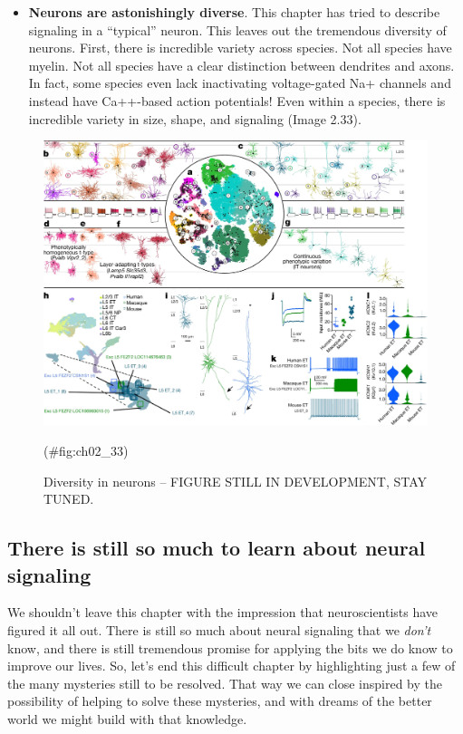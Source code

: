 \documentclass[
]{book}
\begin{document}
\begin{itemize}
\item
  \textbf{Neurons are astonishingly diverse}. This chapter has tried to describe signaling in a ``typical'' neuron. This leaves out the tremendous diversity of neurons. First, there is incredible variety across species. Not all species have myelin. Not all species have a clear distinction between dendrites and axons. In fact, some species even lack inactivating voltage-gated Na+ channels and instead have Ca++-based action potentials! Even within a species, there is incredible variety in size, shape, and signaling (Image 2.33).
\end{itemize}

\begin{figure}

{\centering \includegraphics[width=0.8\linewidth]{images/ch02/02_32} 

}

\caption{Diversity in neurons -- FIGURE STILL IN DEVELOPMENT, STAY TUNED.}(\#fig:ch02_33)
\end{figure}

\hypertarget{there-is-still-so-much-to-learn-about-neural-signaling}{%
\subsection{There is still so much to learn about neural signaling}\label{there-is-still-so-much-to-learn-about-neural-signaling}}

We shouldn't leave this chapter with the impression that neuroscientists have figured it all out. There is still so much about neural signaling that we \emph{don't} know, and there is still tremendous promise for applying the bits we do know to improve our lives. So, let's end this difficult chapter by highlighting just a few of the many mysteries still to be resolved. That way we can close inspired by the possibility of helping to solve these mysteries, and with dreams of the better world we might build with that knowledge.
\end{document}
